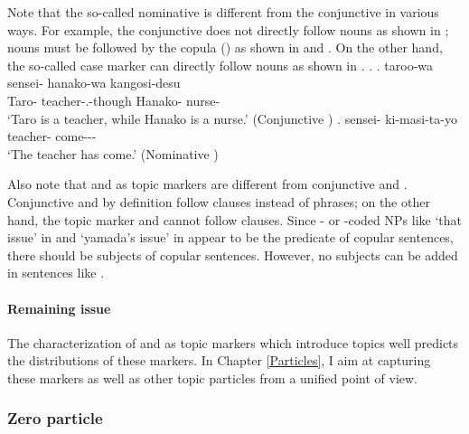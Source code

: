 Note that the so-called nominative  is different from
the conjunctive  in various ways.
For example,
the conjunctive  does not directly follow nouns
as shown in \Last[a];
nouns must be followed by the copula () as shown in \Last[a] and \Next[a].
On the other hand,
the so-called case marker  can directly follow nouns
as shown in \Next[b].
%
\ex.
 \ag. taroo-wa sensei- hanako-wa kangosi-desu \\
      Taro- teacher-.-though Hanako- nurse- \\
      `Taro is a teacher, while Hanako is a nurse.'
      \hfill{(Conjunctive )}
 \bg. sensei- ki-masi-ta-yo \\
      teacher- come--- \\
      `The teacher has come.'
      \hfill{(Nominative )}


Also note that  and  as topic markers are different from
conjunctive  and .
Conjunctive  and  by definition follow clauses
instead of phrases;
on the other hand,
the topic marker  and  cannot follow clauses.
Since - or -coded NPs like  `that issue' in \LLast[a] and  `yamada's issue' in \LLast[b]
appear to be the predicate of copular sentences,
there should be subjects of copular sentences.
However, no subjects can be added in sentences like \LLast.

\paragraph{Remaining issue}

The characterization of  and  as topic markers
which introduce topics well predicts the distributions of these markers.
In Chapter \ref{Particles},
I aim at capturing these markers as well as other topic particles from a unified point of view.


\subsubsection{Zero particle}\label{BackSubSubZero}

